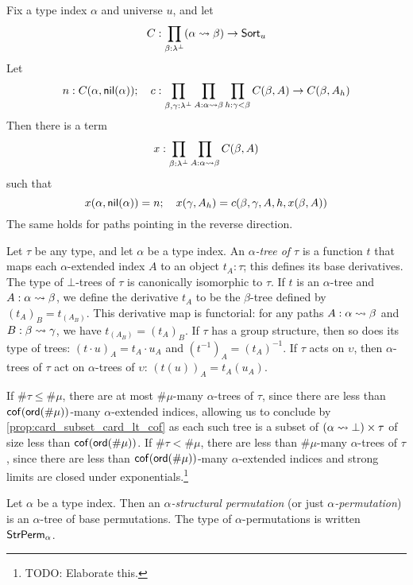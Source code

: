 \begin{proposition}
  \label{prop:Path.rec}
  Fix a type index \( \alpha \) and universe \( u \), and let
  \[ C : \prod_{\beta : \lambda^\bot} (\alpha \rightsquigarrow \beta) \to \mathsf{Sort}_u \]
  Let
  \[ n : C(\alpha, \operatorname{\mathsf{nil}}(\alpha));\quad c : \prod_{\beta, \gamma : \lambda^\bot} \prod_{A : \alpha \rightsquigarrow \beta} \prod_{h : \gamma < \beta} C(\beta, A) \to C(\beta, A_h) \]
  Then there is a term
  \[ x : \prod_{\beta : \lambda^\bot} \prod_{A : \alpha \rightsquigarrow \beta} C(\beta, A) \]
  such that
  \[ x(\alpha, \operatorname{\mathsf{nil}}(\alpha)) = n;\quad x(\gamma, A_h) = c(\beta, \gamma, A, h, x(\beta, A)) \]
  The same holds for paths pointing in the reverse direction.
\end{proposition}
\begin{definition}[tree]
  \label{def:Tree}
  Let \( \tau \) be any type, and let \( \alpha \) be a type index.
  An \emph{\( \alpha \)-tree of \( \tau \)} is a function \( t \) that maps each \( \alpha \)-extended index \( A \) to an object \( t_A : \tau \); this defines its base derivatives.
  The type of \( \bot \)-trees of \( \tau \) is canonically isomorphic to \( \tau \).
  If \( t \) is an \( \alpha \)-tree and \( A : \alpha \rightsquigarrow \beta \), we define the derivative \( t_A \) to be the \( \beta \)-tree defined by \( (t_A)_B = t_{(A_B)} \).
  This derivative map is functorial: for any paths \( A : \alpha \rightsquigarrow \beta \) and \( B : \beta \rightsquigarrow \gamma \), we have \( t_{(A_B)} = (t_A)_B \).
  If \( \tau \) has a group structure, then so does its type of trees: \( (t \cdot u)_A = t_A \cdot u_A \) and \( (t^{-1})_A = (t_A)^{-1} \).
  If \( \tau \) acts on \( \upsilon \), then \( \alpha \)-trees of \( \tau \) act on \( \alpha \)-trees of \( \upsilon \): \( (t(u))_A = t_A(u_A) \).

  If \( \#\tau \leq \#\mu \), there are at most \( \#\mu \)-many \( \alpha \)-trees of \( \tau \), since there are less than \( \operatorname{\mathsf{cof}}(\operatorname{\mathsf{ord}}(\#\mu)) \)-many \( \alpha \)-extended indices, allowing us to conclude by \cref{prop:card_subset_card_lt_cof} as each such tree is a subset of \( (\alpha \rightsquigarrow \bot) \times \tau \) of size less than \( \operatorname{\mathsf{cof}}(\operatorname{\mathsf{ord}}(\#\mu)) \).
  If \( \#\tau < \#\mu \), there are less than \( \#\mu \)-many \( \alpha \)-trees of \( \tau \), since there are less than \( \operatorname{\mathsf{cof}}(\operatorname{\mathsf{ord}}(\#\mu)) \)-many \( \alpha \)-extended indices and strong limits are closed under exponentials.\footnote{TODO: Elaborate this.}
\end{definition}
\begin{definition}
  \label{def:StrPerm}
  Let \( \alpha \) be a type index.
  Then an \emph{\( \alpha \)-structural permutation} (or just \emph{\( \alpha \)-permutation}) is an \( \alpha \)-tree of base permutations.
  The type of \( \alpha \)-permutations is written \( \mathsf{StrPerm}_\alpha \).
\end{definition}
